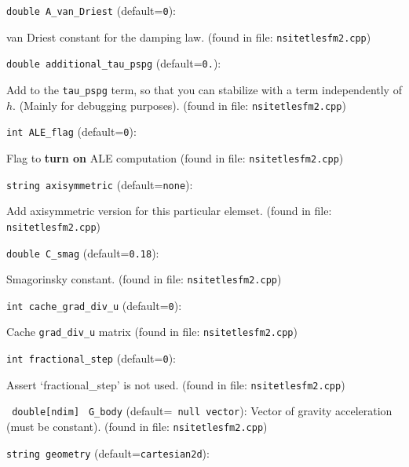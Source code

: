 \item\verb+double A_van_Driest+ {\rm(default=\verb|0|)}:

van Driest constant for the damping law.
 (found in file: \verb+nsitetlesfm2.cpp+)
\item\verb+double additional_tau_pspg+ {\rm(default=\verb|0.|)}:

Add to the  \verb+tau_pspg+  term, so that you can stabilize with a term
 independently of $h$. (Mainly for debugging purposes). 
 (found in file: \verb+nsitetlesfm2.cpp+)
\item\verb+int ALE_flag+ {\rm(default=\verb|0|)}:

Flag to \textbf{turn on} ALE computation
 (found in file: \verb+nsitetlesfm2.cpp+)
\item\verb+string axisymmetric+ {\rm(default=\verb|none|)}:

Add axisymmetric version for this particular elemset.
 (found in file: \verb+nsitetlesfm2.cpp+)
\item\verb+double C_smag+ {\rm(default=\verb|0.18|)}:

Smagorinsky constant.
 (found in file: \verb+nsitetlesfm2.cpp+)
\item\verb+int cache_grad_div_u+ {\rm(default=\verb|0|)}:

Cache  \verb+grad_div_u+  matrix
 (found in file: \verb+nsitetlesfm2.cpp+)
\item\verb+int fractional_step+ {\rm(default=\verb|0|)}:

Assert `fractional_step' is not used. 
 (found in file: \verb+nsitetlesfm2.cpp+)
\item\verb+ double[ndim]+ \verb+ G_body+ {\rm(default=\verb| null vector|)}:
 Vector of gravity acceleration (must be constant).  (found in file: \verb+nsitetlesfm2.cpp+)
\item\verb+string geometry+ {\rm(default=\verb|cartesian2d|)}:

